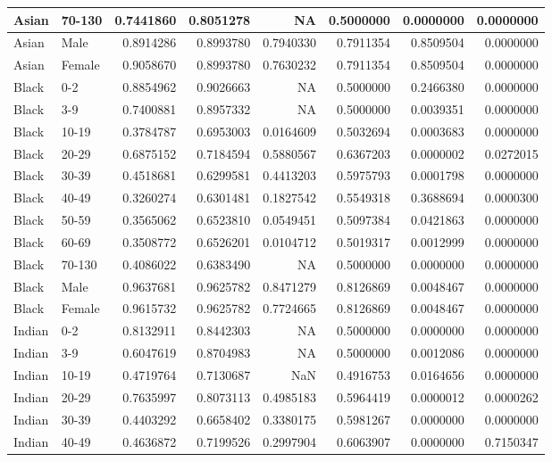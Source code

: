 \documentclass[
  letterpaper,
  DIV=11,
  numbers=noendperiod]{scrreprt}
\begin{document}
\begin{tabular}{l|l|r|r|r|r|r|r}
\hline
Asian & 70-130 & 0.7441860 & 0.8051278 & NA & 0.5000000 & 0.0000000 & 0.0000000\\
\hline
Asian & Male & 0.8914286 & 0.8993780 & 0.7940330 & 0.7911354 & 0.8509504 & 0.0000000\\
\hline
Asian & Female & 0.9058670 & 0.8993780 & 0.7630232 & 0.7911354 & 0.8509504 & 0.0000000\\
\hline
Black & 0-2 & 0.8854962 & 0.9026663 & NA & 0.5000000 & 0.2466380 & 0.0000000\\
\hline
Black & 3-9 & 0.7400881 & 0.8957332 & NA & 0.5000000 & 0.0039351 & 0.0000000\\
\hline
Black & 10-19 & 0.3784787 & 0.6953003 & 0.0164609 & 0.5032694 & 0.0003683 & 0.0000000\\
\hline
Black & 20-29 & 0.6875152 & 0.7184594 & 0.5880567 & 0.6367203 & 0.0000002 & 0.0272015\\
\hline
Black & 30-39 & 0.4518681 & 0.6299581 & 0.4413203 & 0.5975793 & 0.0001798 & 0.0000000\\
\hline
Black & 40-49 & 0.3260274 & 0.6301481 & 0.1827542 & 0.5549318 & 0.3688694 & 0.0000300\\
\hline
Black & 50-59 & 0.3565062 & 0.6523810 & 0.0549451 & 0.5097384 & 0.0421863 & 0.0000000\\
\hline
Black & 60-69 & 0.3508772 & 0.6526201 & 0.0104712 & 0.5019317 & 0.0012999 & 0.0000000\\
\hline
Black & 70-130 & 0.4086022 & 0.6383490 & NA & 0.5000000 & 0.0000000 & 0.0000000\\
\hline
Black & Male & 0.9637681 & 0.9625782 & 0.8471279 & 0.8126869 & 0.0048467 & 0.0000000\\
\hline
Black & Female & 0.9615732 & 0.9625782 & 0.7724665 & 0.8126869 & 0.0048467 & 0.0000000\\
\hline
Indian & 0-2 & 0.8132911 & 0.8442303 & NA & 0.5000000 & 0.0000000 & 0.0000000\\
\hline
Indian & 3-9 & 0.6047619 & 0.8704983 & NA & 0.5000000 & 0.0012086 & 0.0000000\\
\hline
Indian & 10-19 & 0.4719764 & 0.7130687 & NaN & 0.4916753 & 0.0164656 & 0.0000000\\
\hline
Indian & 20-29 & 0.7635997 & 0.8073113 & 0.4985183 & 0.5964419 & 0.0000012 & 0.0000262\\
\hline
Indian & 30-39 & 0.4403292 & 0.6658402 & 0.3380175 & 0.5981267 & 0.0000000 & 0.0000000\\
\hline
Indian & 40-49 & 0.4636872 & 0.7199526 & 0.2997904 & 0.6063907 & 0.0000000 & 0.7150347\\

\end{tabular}
\end{document}
